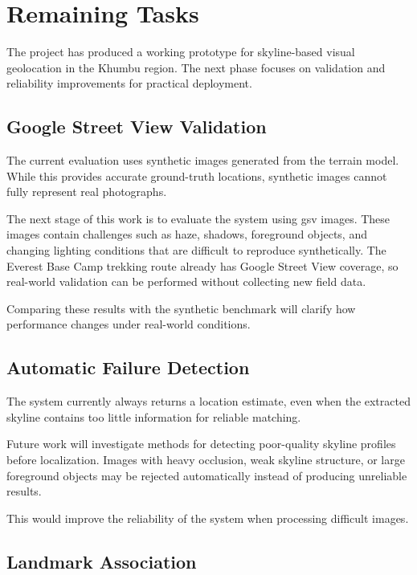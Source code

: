 \chapter{Remaining Tasks}

The project has produced a working prototype for skyline-based visual geolocation in the Khumbu region. The next phase focuses on validation and reliability improvements for practical deployment.

\section{Google Street View Validation}

The current evaluation uses synthetic images generated from the terrain model. While this provides accurate ground-truth locations, synthetic images cannot fully represent real photographs.

The next stage of this work is to evaluate the system using \gls{gsv} images. These images contain challenges such as haze, shadows, foreground objects, and changing lighting conditions that are difficult to reproduce synthetically. The Everest Base Camp trekking route already has Google Street View coverage, so real-world validation can be performed without collecting new field data.

Comparing these results with the synthetic benchmark will clarify how performance changes under real-world conditions.

\section{Automatic Failure Detection}

The system currently always returns a location estimate, even when the extracted skyline contains too little information for reliable matching.

Future work will investigate methods for detecting poor-quality skyline profiles before localization. Images with heavy occlusion, weak skyline structure, or large foreground objects may be rejected automatically instead of producing unreliable results.

This would improve the reliability of the system when processing difficult images.

\section{Landmark Association}

